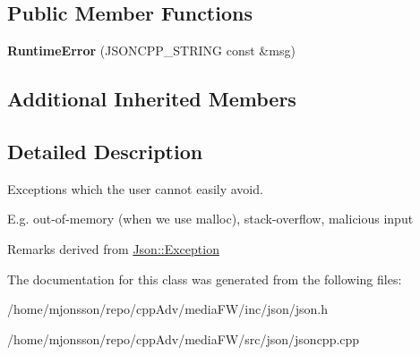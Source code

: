 \subsection*{Public Member Functions}
\begin{DoxyCompactItemize}
\item 
\mbox{\label{classJson_1_1RuntimeError_a0f6445dc345ce0a703610b6e893fee40}} 
{\bfseries Runtime\+Error} (J\+S\+O\+N\+C\+P\+P\+\_\+\+S\+T\+R\+I\+NG const \&msg)
\end{DoxyCompactItemize}
\subsection*{Additional Inherited Members}


\subsection{Detailed Description}
Exceptions which the user cannot easily avoid.

E.\+g. out-\/of-\/memory (when we use malloc), stack-\/overflow, malicious input

\begin{DoxyRemark}{Remarks}
derived from \hyperlink{classJson_1_1Exception}{Json\+::\+Exception} 
\end{DoxyRemark}


The documentation for this class was generated from the following files\+:\begin{DoxyCompactItemize}
\item 
/home/mjonsson/repo/cpp\+Adv/media\+F\+W/inc/json/json.\+h\item 
/home/mjonsson/repo/cpp\+Adv/media\+F\+W/src/json/jsoncpp.\+cpp\end{DoxyCompactItemize}
